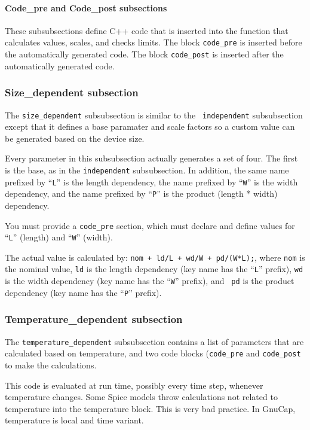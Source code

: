 \paragraph{Code\_pre and Code\_post subsections}

These subsubsections define C++ code that is inserted into the
function that calculates values, scales, and checks limits.  The block
{\tt code\_pre} is inserted before the automatically generated code.
The block {\tt code\_post} is inserted after the automatically
generated code.
\subsubsection{Size\_dependent subsection}

The {\tt size\_dependent} subsubsection is similar to the {\tt
independent} subsubsection except that it defines a base paramater and
scale factors so a custom value can be generated based on the device
size.

Every parameter in this subsubsection actually generates a set of
four.  The first is the base, as in the {\tt independent}
subsubsection.  In addition, the same name prefixed by ``{\tt L}'' is
the length dependency, the name prefixed by ``{\tt W}'' is the width
dependency, and the name prefixed by ``{\tt P}'' is the product
(length * width) dependency.

You must provide a {\tt code\_pre} section, which must declare and
define values for ``{\tt L}'' (length) and ``{\tt W}'' (width).

The actual value is calculated by: {\tt nom + ld/L + wd/W +
pd/(W*L);}, where {\tt nom} is the nominal value, {\tt ld} is the
length dependency (key name has the ``{\tt L}'' prefix), {\tt wd} is
the width dependency (key name has the ``{\tt W}'' prefix), and {\tt
pd} is the product dependency (key name has the ``{\tt P}'' prefix).
\subsubsection{Temperature\_dependent subsection}

The {\tt temperature\_dependent} subsubsection contains a list of
parameters that are calculated based on temperature, and two code
blocks ({\tt code\_pre} and {\tt code\_post} to make the calculations.

This code is evaluated at run time, possibly every time step, whenever
temperature changes.  Some Spice models throw calculations not related
to temperature into the temperature block.  This is very bad practice.
In GnuCap, temperature is local and time variant.
